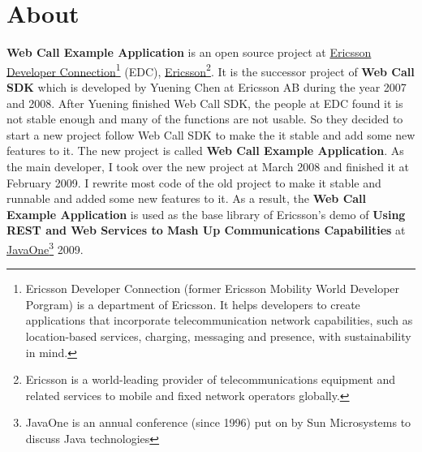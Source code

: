
\clearpage
\section{About}
\label{sec:Introduction:Background:About}

\textbf{Web Call Example Application} is an open source project at \href{http://www.ericsson.com/developer/}{Ericsson Developer Connection}\footnote{Ericsson Developer Connection (former Ericsson Mobility World Developer Porgram) is a department of Ericsson. It helps developers to create applications that incorporate telecommunication network capabilities, such as location-based services, charging, messaging and presence, with sustainability in mind.} (EDC), \href{http://www.ericsson.com/}{Ericsson}\footnote{Ericsson is a world-leading provider of telecommunications equipment and related services to mobile and fixed network operators globally.}. It is the successor project of \textbf{Web Call SDK} \cite{WebCallSDK} which is developed by Yuening Chen at Ericsson AB during the year 2007 and 2008. After Yuening finished Web Call SDK, the people at EDC found it is not stable enough and many of the functions are not usable. So they decided to start a new project follow Web Call SDK to make the it stable and add some new features to it. The new project is called \textbf{Web Call Example Application}. As the main developer, I took over the new project at March 2008 and finished it at February 2009. I rewrite most code of the old project to make it stable and runnable and added some new features to it. As a result, the \textbf{Web Call Example Application} is used as the base library of Ericsson's demo of \textbf{Using REST and Web Services to Mash Up Communications Capabilities} \cite{DemoAtJavaOne} \cite{EricssonJavaOne} at \href{http://java.sun.com/javaone/}{JavaOne}\texttrademark\footnote{JavaOne is an annual conference (since 1996) put on by Sun Microsystems to discuss Java technologies} 2009.
